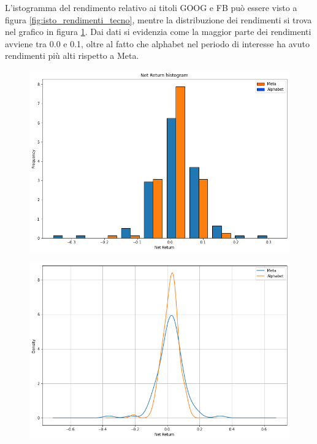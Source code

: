 \documentclass{article}
\begin{document}
L'istogramma del rendimento relativo ai titoli GOOG e FB può essere visto a figura \ref{fig:isto_rendimenti_tecno}, mentre la distribuzione dei 
rendimenti si trova nel grafico in figura \ref{fig:dispersione_tecno}.
Dai dati si evidenzia come la maggior parte dei rendimenti avviene tra 0.0 e 0.1, oltre al fatto che alphabet nel periodo di interesse ha avuto rendimenti più alti
rispetto a Meta.

\begin{figure}[h]
  \centering
  \begin{minipage}{.5\textwidth}
    \centering
    \includegraphics[width=1\linewidth]{net_ret_tecno_hist.png}
    \label{fig:isto_rendimenti_tecno}
  \end{minipage}%
  \begin{minipage}{.5\textwidth}
    \centering
    \includegraphics[width=1\linewidth]{dispersione_tecno.png}
    \label{fig:dispersione_tecno}
  \end{minipage}
\end{figure}
\end{document}
